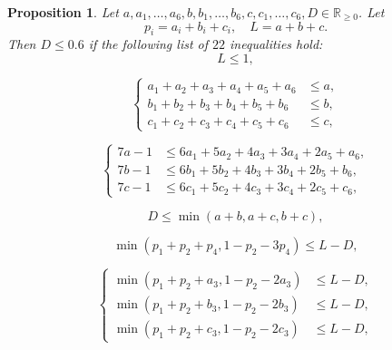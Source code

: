 \documentclass[a4paper,11pt,twoside,reqno]{amsart}
\newcommand\RR{\mathbb{R}}
\renewcommand{\le}{\leqslant}
\renewcommand{\geq}{\geqslant}
\theoremstyle{plain}
\newtheorem{prop}{Proposition}
\theoremstyle{remark}
\numberwithin{prop}{section}
\numberwithin{equation}{section}
\begin{document}
\begin{prop}\label{prop:linear_program}
    Let $a,a_1,\dots,a_6,b,b_1,\dots,b_6,c,c_1,\dots,c_6,D \in \RR_{\geq 0}$. Let  
    $$
    p_i=a_i+b_i+c_i, \quad L=a+b+c. 
     $$
 Then $D \le 0.6$ if the  following list of $22$ inequalities hold:
    \begin{equation}\label{eq:1}
            L \le 1,
    \end{equation}

\medskip

    \begin{equation}\label{eq:2}
\left\{
\begin{aligned}
a_1+a_2+a_3+a_4+a_5+a_6 &\le a,\\
b_1+b_2+b_3+b_4+b_5+b_6 &\le b,\\
c_1+c_2+c_3+c_4+c_5+c_6 &\le c,
\end{aligned}
\right.
\end{equation}

\medskip

\begin{equation}\label{eq:3}
\left\{
\begin{aligned}
        7a-1 &\le 6a_1+5a_2+4a_3+3a_4+2a_5+a_6,\\
        7b-1 &\le 6b_1+5b_2+4b_3+3b_4+2b_5+b_6,\\
        7c-1 &\le 6c_1+5c_2+4c_3+3c_4+2c_5+c_6,
\end{aligned}
\right.
\end{equation}

\medskip

        \begin{equation}\label{eq:4}
        D \le \min(a+b,a+c,b+c),
    \end{equation}

\medskip

\begin{equation}\label{eq:5}
       \min(p_1+p_2+p_4,1-p_2-3p_4) \le L-D,
    \end{equation}

\medskip

\begin{equation}\label{eq:6}
\left\{
\begin{aligned}
        \min(p_1+p_2+a_3,1-p_2-2a_3) &\le L-D,\\
        \min(p_1+p_2+b_3,1-p_2-2b_3) &\le L-D,\\
        \min(p_1+p_2+c_3,1-p_2-2c_3) &\le L-D,
\end{aligned}
\right.
\end{equation}


\end{prop}
\end{document}
